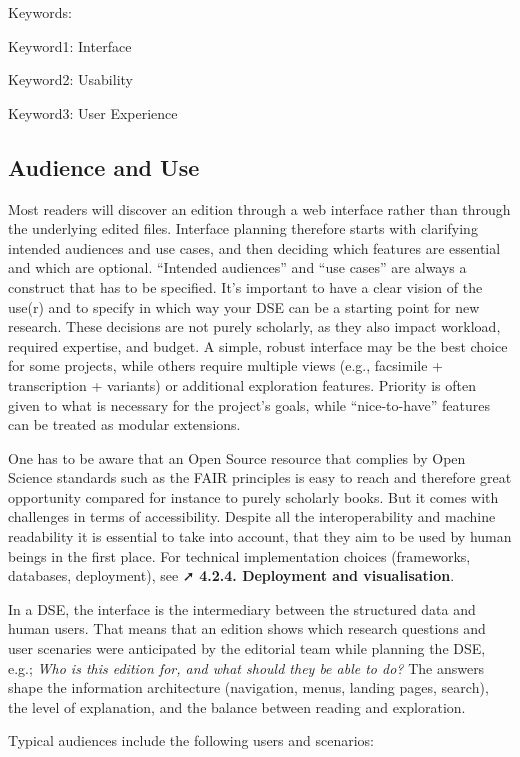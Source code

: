 \documentclass[
  letterpaper,
  DIV=11,
  numbers=noendperiod]{scrreprt}
\begin{document}
Keywords:

Keyword1: Interface

Keyword2: Usability

Keyword3: User Experience

\subsection{Audience and Use}\label{audience-and-use}

Most readers will discover an edition through a web interface rather
than through the underlying edited files. Interface planning therefore
starts with clarifying intended audiences and use cases, and then
deciding which features are essential and which are optional. ``Intended
audiences'' and ``use cases'' are always a construct that has to be
specified. It's important to have a clear vision of the use(r) and to
specify in which way your DSE can be a starting point for new research.
These decisions are not purely scholarly, as they also impact workload,
required expertise, and budget. A simple, robust interface may be the
best choice for some projects, while others require multiple views
(e.g., facsimile + transcription + variants) or additional exploration
features. Priority is often given to what is necessary for the project's
goals, while ``nice-to-have'' features can be treated as modular
extensions.

One has to be aware that an Open Source resource that complies by Open
Science standards such as the FAIR principles is easy to reach and
therefore great opportunity compared for instance to purely scholarly
books. But it comes with challenges in terms of accessibility. Despite
all the interoperability and machine readability it is essential to take
into account, that they aim to be used by human beings in the first
place. For technical implementation choices (frameworks, databases,
deployment), see ➚ \textbf{4.2.4. Deployment and visualisation}.

In a DSE, the interface is the intermediary between the structured data
and human users. That means that an edition shows which research
questions and user scenaries were anticipated by the editorial team
while planning the DSE, e.g.; \emph{Who is this edition for, and what
should they be able to do?} The answers shape the information
architecture (navigation, menus, landing pages, search), the level of
explanation, and the balance between reading and exploration.

Typical audiences include the following users and scenarios:
\end{document}
